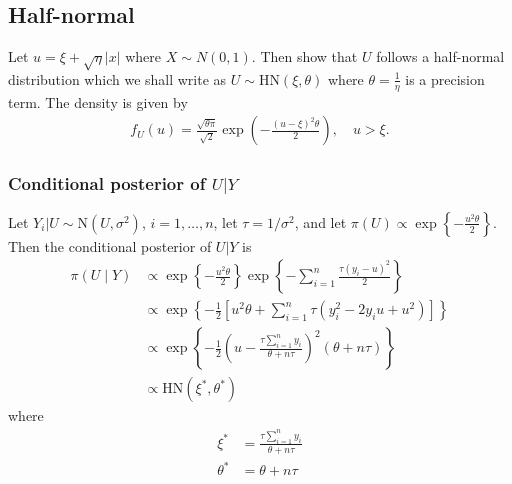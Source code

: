 
\subsection*{Half-normal}\label{s:hn}
Let $u = \xi + \sqrt{\eta} |x|$ where $X \sim N(0, 1)$.
Then \citet{Wiper2008} show that $U$ follows a half-normal distribution which we shall write as $U \sim \mbox{HN}(\xi, \theta )$ where $\theta = \displaystyle \frac{ 1 }{ \eta }$ is a precision term.
The density is given by 
\begin{align}
  f_U(u) = \frac{ \sqrt{\theta \pi} }{ \sqrt{2} } \exp \left( - \frac{ (u-\xi)^2 \theta }{ 2 } \right), \quad u > \xi.
\end{align}

\subsubsection*{Conditional posterior of $U | Y$}\label{s:condu}
Let $Y_i | U \sim \mbox{N}(U, \sigma^2)$, $i = 1, \ldots, n$, let $\tau = 1 / \sigma^2$, and let $\pi(U) \propto \exp \left\{ -\frac{ u^2 \theta }{ 2 } \right\}$. 
Then the conditional posterior of $U | Y$ is 
\begin{align}
  \pi (U \mid Y) & \propto \exp \left\{ -\frac{ u^2 \theta }{ 2 } \right\} \exp \left\{ - \sum_{i = 1 }^n\frac{ \tau (y_i - u)^2 }{ 2 } \right\} \nonumber \\
    & \propto \exp \left\{ -\frac{ 1 }{ 2 } \left[ u^2 \theta + \sum_{i=1 }^n\tau (y_i^2 - 2y_iu + u^2) \right] \right\} \nonumber \\
    & \propto \exp \left\{ - \frac{ 1 }{ 2 }\left( u - \frac{ \tau \sum_{i=1}^n y_i }{ \theta + n \tau } \right)^2 \left( \theta + n \tau \right) \right\} \nonumber\\
    & \propto \mbox{HN}(\xi^*, \theta^*) \label{eq:condu}
\end{align}
where 
\begin{align*}
  \xi^* &= \frac{ \tau \sum_{i=1}^n y_i }{ \theta + n \tau }\\
  \theta^* &= \theta + n \tau
\end{align*}

